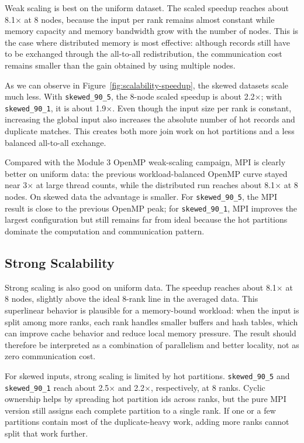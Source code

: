 \documentclass[11pt,a4paper]{article}
\begin{document}
Weak scaling is best on the uniform dataset.  The scaled speedup reaches about 8.1$\times$ at 8 nodes, because the input per rank remains almost constant while memory capacity and memory bandwidth grow with the number of nodes.  This is the case where distributed memory is most effective: although records still have to be exchanged through the all-to-all redistribution, the communication cost remains smaller than the gain obtained by using multiple nodes.

As we can observe in Figure~\ref{fig:scalability-speedup}, the skewed datasets scale much less.  With \texttt{skewed\_90\_5}, the 8-node scaled speedup is about 2.2$\times$; with \texttt{skewed\_90\_1}, it is about 1.9$\times$.  Even though the input size per rank is constant, increasing the global input also increases the absolute number of hot records and duplicate matches.  This creates both more join work on hot partitions and a less balanced all-to-all exchange.

Compared with the Module 3 OpenMP weak-scaling campaign, MPI is clearly better on uniform data: the previous workload-balanced OpenMP curve stayed near 3$\times$ at large thread counts, while the distributed run reaches about 8.1$\times$ at 8 nodes.  On skewed data the advantage is smaller.  For \texttt{skewed\_90\_5}, the MPI result is close to the previous OpenMP peak; for \texttt{skewed\_90\_1}, MPI improves the largest configuration but still remains far from ideal because the hot partitions dominate the computation and communication pattern.

\subsection{Strong Scalability}

Strong scaling is also good on uniform data.  The speedup reaches about 8.1$\times$ at 8 nodes, slightly above the ideal 8-rank line in the averaged data.  This superlinear behavior is plausible for a memory-bound workload: when the input is split among more ranks, each rank handles smaller buffers and hash tables, which can improve cache behavior and reduce local memory pressure.  The result should therefore be interpreted as a combination of parallelism and better locality, not as zero communication cost.

For skewed inputs, strong scaling is limited by hot partitions.  \texttt{skewed\_90\_5} and \texttt{skewed\_90\_1} reach about 2.5$\times$ and 2.2$\times$, respectively, at 8 ranks.  Cyclic ownership helps by spreading hot partition ids across ranks, but the pure MPI version still assigns each complete partition to a single rank.  If one or a few partitions contain most of the duplicate-heavy work, adding more ranks cannot split that work further.
\end{document}
